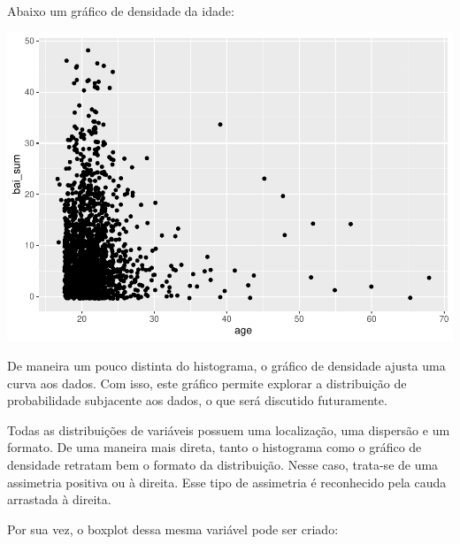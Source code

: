 \documentclass[
]{book}
\newenvironment{Shaded}{\begin{snugshade}}{\end{snugshade}}
\newcommand{\DataTypeTok}[1]{\textcolor[rgb]{0.13,0.29,0.53}{#1}}
\newcommand{\KeywordTok}[1]{\textcolor[rgb]{0.13,0.29,0.53}{\textbf{#1}}}
\newcommand{\NormalTok}[1]{#1}
\newcommand{\OperatorTok}[1]{\textcolor[rgb]{0.81,0.36,0.00}{\textbf{#1}}}
\newcommand{\StringTok}[1]{\textcolor[rgb]{0.31,0.60,0.02}{#1}}
\begin{document}
Abaixo um gráfico de densidade da idade:

\begin{Shaded}
\end{Shaded}

\begin{center}\includegraphics{gitbook-demo_files/figure-latex/unnamed-chunk-23-1} \end{center}

De maneira um pouco distinta do histograma, o gráfico de densidade ajusta uma curva aos dados. Com isso, este gráfico permite explorar a distribuição de probabilidade subjacente aos dados, o que será discutido futuramente.

Todas as distribuições de variáveis possuem uma localização, uma dispersão e um formato. De uma maneira mais direta, tanto o histograma como o gráfico de densidade retratam bem o formato da distribuição. Nesse caso, trata-se de uma assimetria positiva ou à direita. Esse tipo de assimetria é reconhecido pela cauda arrastada à direita.

Por sua vez, o boxplot dessa mesma variável pode ser criado:

\begin{Shaded}
\end{Shaded}
\end{document}
